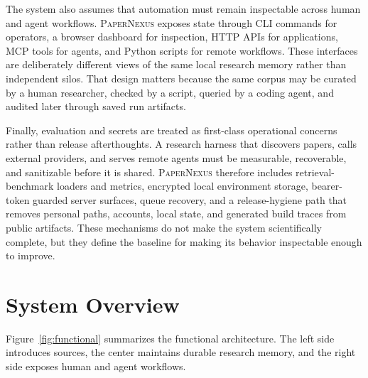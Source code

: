 \documentclass[11pt]{article}
\newcommand{\papernexus}{\textsc{PaperNexus}}
\newcommand{\mcp}{\textsc{MCP}}
\begin{document}
The system also assumes that automation must remain inspectable across human and agent workflows. \papernexus{} exposes state through CLI commands for operators, a browser dashboard for inspection, HTTP APIs for applications, \mcp{} tools for agents, and Python scripts for remote workflows. These interfaces are deliberately different views of the same local research memory rather than independent silos. That design matters because the same corpus may be curated by a human researcher, checked by a script, queried by a coding agent, and audited later through saved run artifacts.

Finally, evaluation and secrets are treated as first-class operational concerns rather than release afterthoughts. A research harness that discovers papers, calls external providers, and serves remote agents must be measurable, recoverable, and sanitizable before it is shared. \papernexus{} therefore includes retrieval-benchmark loaders and metrics, encrypted local environment storage, bearer-token guarded server surfaces, queue recovery, and a release-hygiene path that removes personal paths, accounts, local state, and generated build traces from public artifacts. These mechanisms do not make the system scientifically complete, but they define the baseline for making its behavior inspectable enough to improve.

\section{System Overview}

Figure~\ref{fig:functional} summarizes the functional architecture. The left side introduces sources, the center maintains durable research memory, and the right side exposes human and agent workflows.
\end{document}
